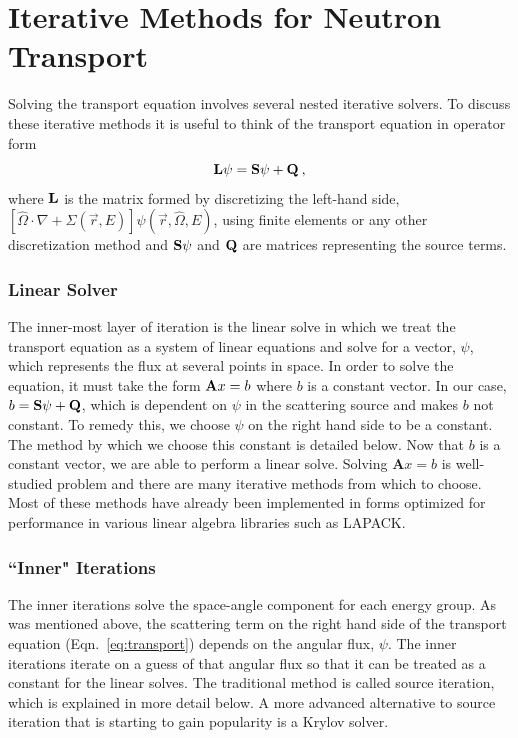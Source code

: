 
\section{Iterative Methods for Neutron Transport}
Solving the transport equation involves several nested iterative solvers. To discuss these iterative methods it is useful to think of the transport equation in operator form
\begin{equation}
    \bf{L}\psi = \bf{S}\psi + \bf{Q} \:,
\end{equation}
where $\bf{L}$ is the matrix formed by discretizing the left-hand side, $[\hat{\Omega} \cdot \nabla + \Sigma(\vec{r}, E)]\psi(\vec{r}, \hat{\Omega}, E)$, using finite elements or any other discretization method and $\bf{S}\psi$ and $\bf{Q}$ are matrices representing the source terms. 

\subsubsection{Linear Solver}
The inner-most layer of iteration is the linear solve in which we treat the transport equation as a system of linear equations and solve for a vector, $\psi$, which represents the flux at several points in space. In order to solve the equation, it must take the form ${\bf A} x = b$ where $b$ is a constant vector. In our case, $b = {\bf S} \psi + {\bf Q}$, which is dependent on $\psi$ in the scattering source and makes $b$ not constant. To remedy this, we choose $\psi$ on the right hand side to be a constant. The method by which we choose this constant is detailed below. Now that $b$ is a constant vector, we are able to perform a linear solve. Solving $\textbf{A}x = b$ is well-studied problem and there are many iterative methods from which to choose. Most of these methods have already been implemented in forms optimized for performance in various linear algebra libraries such as LAPACK.

\subsubsection{``Inner" Iterations}
The inner iterations solve the space-angle component for each energy group. As was mentioned above, the scattering term on the right hand side of the transport equation (Eqn.~\ref{eq:transport}) depends on the angular flux, $\psi$. The inner iterations iterate on a guess of that angular flux so that it can be treated as a constant for the linear solves. The traditional method is called source iteration, which is explained in more detail below. A more advanced alternative to source iteration that is starting to gain popularity is a Krylov solver. 

